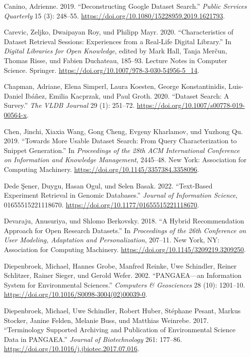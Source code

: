 \documentclass[a4paper,
fontsize=11pt,
oneside,
numbers=noperiodatend,
parskip=half-,
bibliography=totoc,
final
]{scrartcl}
\begin{document}
Canino, Adrienne. 2019. \enquote{Deconstructing Google Dataset Search.}
\emph{Public Services Quarterly} 15 (3): 248--55.
\url{https://doi.org/10.1080/15228959.2019.1621793}.

Carevic, Zeljko, Dwaipayan Roy, und Philipp Mayr. 2020.
\enquote{Characteristics of Dataset Retrieval Sessions: Experiences from
a Real-Life Digital Library.} In \emph{Digital Libraries for Open
Knowledge}, edited by Mark Hall, Tanja Merčun, Thomas Risse, und Fabien
Duchateau, 185--93. Lecture Notes in Computer Science. Springer.
\url{https://doi.org/10.1007/978-3-030-54956-5_14}.

Chapman, Adriane, Elena Simperl, Laura Koesten, George Konstantinidis,
Luis-Daniel Ibáñez, Emilia Kacprzak, und Paul Groth. 2020.
\enquote{Dataset Search: A Survey.} \emph{The VLDB Journal} 29 (1):
251--72. \url{https://doi.org/10.1007/s00778-019-00564-x}.

Chen, Jinchi, Xiaxia Wang, Gong Cheng, Evgeny Kharlamov, und Yuzhong Qu.
2019. \enquote{Towards More Usable Dataset Search: From Query
Characterization to Snippet Generation.} In \emph{Proceedings of the
28th ACM International Conference on Information and Knowledge
Management}, 2445--48. New York: Association for Computing Machinery.
\url{https://doi.org/10.1145/3357384.3358096}.

Dede Şener, Duygu, Hasan Ogul, und Selen Basak. 2022.
\enquote{Text-Based Experiment Retrieval in Genomic Databases.}
\emph{Journal of Information Science}, 01655515221118670.
\url{https://doi.org/10.1177/01655515221118670}.

Devaraju, Anusuriya, und Shlomo Berkovsky. 2018. \enquote{A Hybrid
Recommendation Approach for Open Research Datasets.} In
\emph{Proceedings of the 26th Conference on User Modeling, Adaptation
and Personalization}, 207--11. New York, NY: Association for Computing
Machinery. \url{https://doi.org/10.1145/3209219.3209250}.

Diepenbroek, Michael, Hannes Grobe, Manfred Reinke, Uwe Schindler,
Reiner Schlitzer, Rainer Sieger, und Gerold Wefer. 2002.
\enquote{PANGAEA---an Information System for Environmental Sciences.}
\emph{Computers \& Geosciences} 28 (10): 1201--10.
\url{https://doi.org/10.1016/S0098-3004(02)00039-0}.

Diepenbroek, Michael, Uwe Schindler, Robert Huber, Stéphane Pesant,
Markus Stocker, Janine Felden, Melanie Buss, und Matthias Weinrebe.
2017. \enquote{Terminology Supported Archiving and Publication of
Environmental Science Data in PANGAEA.} \emph{Journal of Biotechnology}
261: 177--86. \url{https://doi.org/10.1016/j.jbiotec.2017.07.016}.
\end{document}
